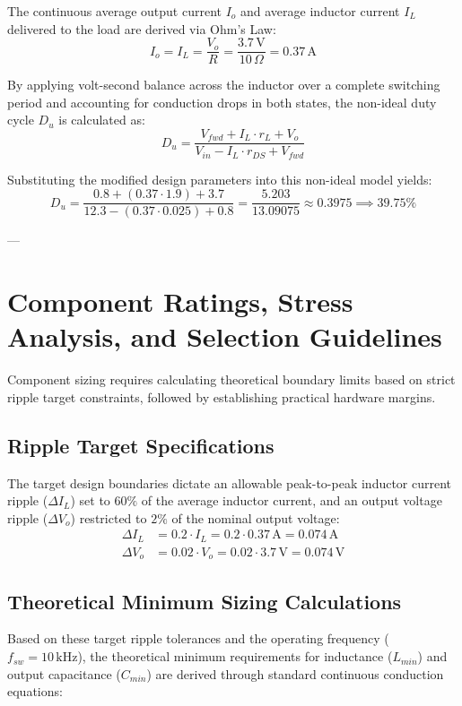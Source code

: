 \documentclass[12pt,a4paper]{article}
\begin{document}
The continuous average output current $I_o$ and average inductor current $I_L$ delivered to the load are derived via Ohm's Law:
\begin{equation}
I_o = I_L = \frac{V_o}{R} = \frac{3.7\,\text{V}}{10\,\Omega} = 0.37\,\text{A}
\end{equation}

By applying volt-second balance across the inductor over a complete switching period and accounting for conduction drops in both states, the non-ideal duty cycle $D_u$ is calculated as:
\begin{equation}
D_u = \frac{V_{fwd} + I_L \cdot r_L + V_o}{V_{in} - I_L \cdot r_{DS} + V_{fwd}}
\end{equation}

Substituting the modified design parameters into this non-ideal model yields:
\begin{equation}
D_u = \frac{0.8 + (0.37 \cdot 1.9) + 3.7}{12.3 - (0.37 \cdot 0.025) + 0.8} = \frac{5.203}{13.09075} \approx 0.3975 \implies 39.75\%
\end{equation}

---

\section{Component Ratings, Stress Analysis, and Selection Guidelines}
Component sizing requires calculating theoretical boundary limits based on strict ripple target constraints, followed by establishing practical hardware margins.

\subsection{Ripple Target Specifications}
The target design boundaries dictate an allowable peak-to-peak inductor current ripple ($\Delta I_L$) set to $60\%$ of the average inductor current, and an output voltage ripple ($\Delta V_o$) restricted to $2\%$ of the nominal output voltage:
\begin{align*}
\Delta I_L &= 0.2 \cdot I_L = 0.2 \cdot 0.37\,\text{A} = 0.074\,\text{A} \\
\Delta V_o &= 0.02 \cdot V_o = 0.02 \cdot 3.7\,\text{V} = 0.074\,\text{V}
\end{align*}

\subsection{Theoretical Minimum Sizing Calculations}
Based on these target ripple tolerances and the operating frequency ($f_{sw} = 10\,\text{kHz}$), the theoretical minimum requirements for inductance ($L_{min}$) and output capacitance ($C_{min}$) are derived through standard continuous conduction equations:
\end{document}
